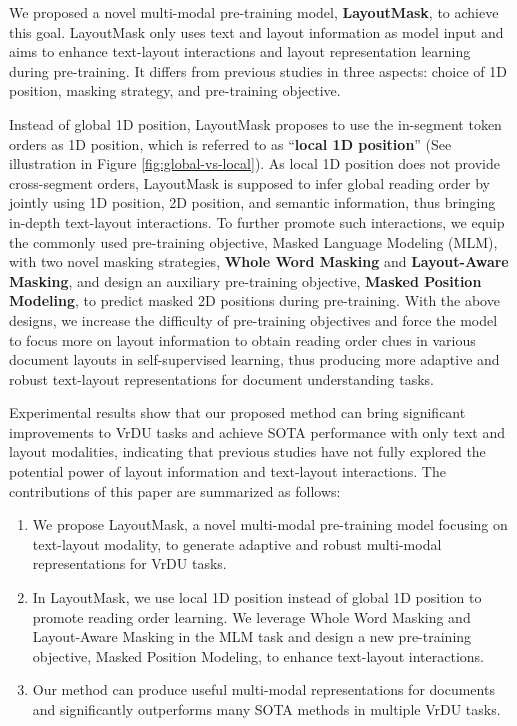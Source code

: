 \documentclass[11pt]{article}
\begin{document}
We proposed a novel multi-modal pre-training model, \textbf{LayoutMask}, to achieve this goal.
LayoutMask only uses text and layout information as model input and aims to enhance text-layout interactions and layout representation learning during pre-training.
It differs from previous studies in three aspects: choice of 1D position, masking strategy, and pre-training objective.

Instead of global 1D position, LayoutMask proposes to use the in-segment token orders as 1D position, which is referred to as ``\textbf{local 1D position}'' (See illustration in Figure \ref{fig:global-vs-local}). 
As local 1D position does not provide cross-segment orders, LayoutMask is supposed to infer global reading order by jointly using 1D position, 2D position, and semantic information, thus bringing in-depth text-layout interactions. 
To further promote such interactions, we equip the commonly used pre-training objective, Masked Language Modeling (MLM), with two novel masking strategies, \textbf{Whole Word Masking} and \textbf{Layout-Aware Masking}, and design an auxiliary pre-training objective, \textbf{Masked Position Modeling}, to predict masked 2D positions during pre-training.
With the above designs, we increase the difficulty of pre-training objectives and force the model to focus more on layout information to obtain reading order clues in various document layouts in self-supervised learning, thus producing more adaptive and robust text-layout representations for document understanding tasks.

Experimental results show that our proposed method can bring significant improvements to VrDU tasks and achieve SOTA performance with only text and layout modalities, indicating that previous studies have not fully explored the potential power of layout information and text-layout interactions.
The contributions of this paper are summarized as follows:

\begin{enumerate}
\item We propose LayoutMask, a novel multi-modal pre-training model focusing on text-layout modality, to generate adaptive and robust multi-modal representations for VrDU tasks.
\item In LayoutMask, we use local 1D position instead of global 1D position to promote reading order learning. We leverage Whole Word Masking and Layout-Aware Masking in the MLM task and design a new pre-training objective, Masked Position Modeling, to enhance text-layout interactions.  
\item Our method can produce useful multi-modal representations for documents and significantly outperforms many SOTA methods in multiple VrDU tasks. 

\iffalse
\begin{figure}[t]
	\centering
	\texttt{[image: images/reading\_order.png]}
	\caption{Two examples that do not apply to the ``top-bottom and left-right'' rule. (a) A receipt with vertical layout; (b) A paper with two-column layout.}
	\label{fig:one}
\end{figure}
\fi

\end{enumerate}
\end{document}
